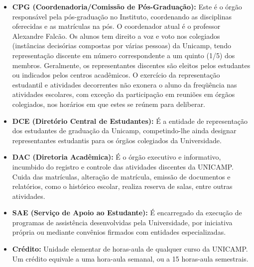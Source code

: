\begin{itemize}
\item  \textbf{CPG (Coordenadoria/Comissão de Pós-Graduação):} Este é o órgão responsável pela pós-graduação no Instituto, coordenando as disciplinas oferecidas e as matrículas na pós. O coordenador atual é o professor Alexandre Falcão. Os alunos tem direito a voz e voto nos colegiados (instâncias decisórias compostas por várias pessoas) da Unicamp, tendo representação discente em número correspondente a um quinto (1/5) dos membros. Geralmente, os representantes discentes são eleitos pelos estudantes ou indicados pelos centros acadêmicos. O exercício da representação estudantil e atividades decorrentes não exonera o aluno da freqüência nas atividades escolares, com exceção da participação em reuniões em órgãos colegiados, nos horários em que estes se reúnem para deliberar.
\end{itemize}

\begin{itemize}
\item  \textbf{DCE (Diretório Central de Estudantes):} É a entidade de representação dos estudantes de graduação da Unicamp, competindo-lhe ainda designar representantes estudantis para os órgãos colegiados da Universidade.
\end{itemize}

\begin{itemize}
\item  \textbf{DAC (Diretoria Acadêmica):} É o órgão executivo e informativo, incumbido do registro e controle das atividades discentes da UNICAMP. Cuida das matrículas, alteração de matrícula, emissão de documentos e relatórios, como o histórico escolar, realiza reserva de salas, entre outras atividades.
\end{itemize}

\begin{itemize}
\item  \textbf{SAE (Serviço de Apoio ao Estudante):} É encarregado da execução de programas de assistência desenvolvidas pela Universidade, por iniciativa própria ou mediante convênios firmados com entidades especializadas.
\end{itemize}

\begin{itemize}
\item  \textbf{Crédito:} Unidade elementar de horas-aula de qualquer curso da UNICAMP. Um crédito equivale a uma hora-aula semanal, ou a 15 horas-aula semestrais.
\end{itemize}

